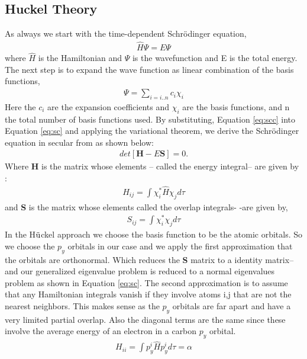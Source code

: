 \documentclass[9pt,twocolumn,twoside]{optica}
\begin{document}
\subsection{Huckel Theory}
As always we start with the time-dependent Schrödinger equation,
\begin{align}
 \hat{H}\Psi = E\Psi
 \label{eq:sc}
\end{align}
where $\hat{H}$ is the Hamiltonian and $\Psi$ is the wavefunction and E is the total energy. The next step is to expand the wave function as linear combination of the basis functions,
\begin{align}
 \Psi=\sum_{i=i..n}c_i \chi_i
 \label{eq:scc}
\end{align}
Here the $c_i$ are the expansion coefficients and  $ \chi_i$ are the basis functions, and n the total number of basis functions used. By substituting, Equation  \ref{eq:scc} into Equation  \ref{eq:sc} and applying the variational theorem, we derive the Schrödinger equation in secular from as shown below:
\begin{align}
 det[\textbf{H}-E\textbf{S}]=0.
 \label{eq:sec}
\end{align}
Where \textbf{H} is the matrix whose elements -- called the energy integral-- are given by :
\begin{align}
 H_{ij}=\int \chi_i ^{*} \hat{H}  \chi_j d\tau
 \label{eq:genH}
\end{align}
and \textbf{S}  is the matrix whose elements called the overlap integrals- -are given by,
\begin{align}
 S_{ij}=\int \chi_i ^{*} \chi_j d\tau
 \label{eq:overlap}
\end{align}
In the H$\ddot{\text u}$ckel approach we choose the basis function to be the atomic orbitals. So we choose the $p_y$ orbitals in our case and we apply the first approximation that the orbitals are orthonormal. Which reduces the \textbf{S}  matrix to a identity matrix-- and our generalized eigenvalue problem is reduced to a normal eigenvalues problem as shown in Equation \ref{eq:sc}. The second approximation is to assume that any Hamiltonian integrals vanish if they involve atoms i,j that are not the nearest neighbors. This makes sense as the  $p_y$ orbitals are far apart and have a very limited partial overlap. Also the diagonal terms are the same since these involve the average energy of an electron in a carbon $p_y$ orbital.
\begin{align}
 H_{ii}=\int p_y ^{i} \hat{H}  p_y ^{i} d\tau =\alpha
 \label{eq:pHii}
\end{align}
\end{document}
